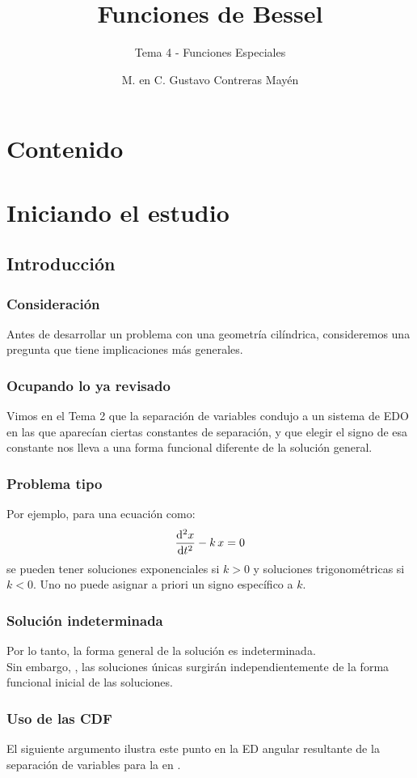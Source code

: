 \documentclass[12pt]{beamer}
\date{}
\title{\large{Funciones de Bessel}}
\subtitle{Tema 4 - Funciones Especiales}
\author{M. en C. Gustavo Contreras Mayén}
\begin{document}
\maketitle
\fontsize{14}{14}\selectfont
{}

\section*{Contenido}

\section{Iniciando el estudio}
\subsection{Introducción}

\begin{frame} 
\frametitle{Consideración}
Antes de desarrollar un problema con una geometría cilíndrica, consideremos una pregunta que tiene implicaciones más generales.
\end{frame}
\begin{frame}
\frametitle{Ocupando lo ya revisado}
Vimos en el Tema 2 que la separación de variables condujo a un sistema de EDO en las que aparecían ciertas constantes de separación, y que elegir el signo de esa constante nos lleva a una forma funcional diferente de la solución general.
\end{frame}
\begin{frame}
\frametitle{Problema tipo}
Por ejemplo, para una ecuación como:
\pause
\begin{align*}
\dv[2]{x}{t} - k \, x = 0
\end{align*}
\pause
se pueden tener soluciones exponenciales si $k > 0$ y soluciones trigonométricas si $k < 0$. \pause Uno no puede asignar a priori un signo específico a $k$.
\end{frame}
\begin{frame}
\frametitle{Solución indeterminada}
Por lo tanto, la forma general de la solución es indeterminada. 
\\
\bigskip
\pause
Sin embargo, , las soluciones únicas surgirán independientemente de la forma funcional inicial de las soluciones.
\end{frame}
\begin{frame}
\frametitle{Uso de las CDF}
El siguiente argumento ilustra este punto en la ED angular resultante de la separación de variables para la  en .
\end{frame}
\end{document}
